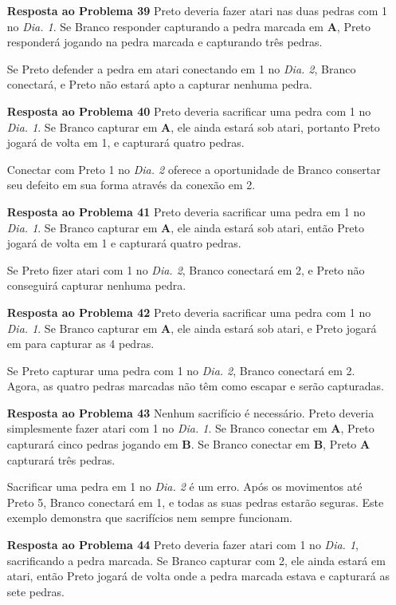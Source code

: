 \begin{itemize}
    \item[\textbf{Resposta ao Problema 39}] Preto deveria fazer atari nas duas pedras com 1 no \emph{Dia. 1}. Se Branco responder capturando a pedra marcada em \textbf{A}, Preto responderá jogando na pedra marcada e capturando três pedras.
    
        Se Preto defender a pedra em atari conectando em 1 no \emph{Dia. 2}, Branco conectará, e Preto não estará apto a capturar nenhuma pedra.
    \item[\textbf{Resposta ao Problema 40}] Preto deveria sacrificar uma pedra com 1 no \emph{Dia. 1}. Se Branco capturar em \textbf{A}, ele ainda estará sob atari, portanto Preto jogará de volta em 1, e capturará quatro pedras.
    
        Conectar com Preto 1 no \emph{Dia. 2} oferece a oportunidade de Branco consertar seu defeito em sua forma através da conexão em 2.
    \item[\textbf{Resposta ao Problema 41}] Preto deveria sacrificar uma pedra em 1 no \emph{Dia. 1}. Se Branco capturar em \textbf{A}, ele ainda estará sob atari, então Preto jogará de volta em 1 e capturará quatro pedras.
    
        Se Preto fizer atari com 1 no \emph{Dia. 2}, Branco conectará em 2, e Preto não conseguirá capturar nenhuma pedra.
    \item[\textbf{Resposta ao Problema 42}] Preto deveria sacrificar uma pedra com 1 no \emph{Dia. 1}. Se Branco capturar em \textbf{A}, ele ainda estará sob atari, e Preto jogará em para capturar as 4 pedras.
    
        Se Preto capturar uma pedra com 1 no \emph{Dia. 2}, Branco conectará em 2. Agora, as quatro pedras marcadas não têm como escapar e serão capturadas.
    \item[\textbf{Resposta ao Problema 43}] Nenhum sacrifício é necessário. Preto deveria simplesmente fazer atari com 1 no \emph{Dia. 1}. Se Branco conectar em \textbf{A}, Preto capturará cinco pedras jogando em \textbf{B}. Se Branco conectar em \textbf{B}, Preto \textbf{A} capturará três pedras.
    
        Sacrificar uma pedra em 1 no \emph{Dia. 2} é um erro. Após os movimentos até Preto 5, Branco conectará em 1, e todas as suas pedras estarão seguras. Este exemplo demonstra que sacrifícios nem sempre funcionam.
    \item[\textbf{Resposta ao Problema 44}] Preto deveria fazer atari com 1 no \emph{Dia. 1}, sacrificando a pedra marcada. Se Branco capturar com 2, ele ainda estará em atari, então Preto jogará de volta onde a pedra marcada estava e capturará as sete pedras.
    

\end{itemize}
